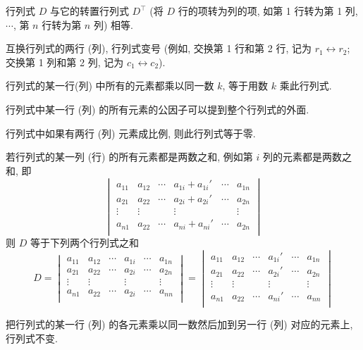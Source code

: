 \begin{theorem}[行列式的转置]
    行列式 $ D $ 与它的转置行列式 $ D^{\top} $ (将 $ D $ 行的项转为列的项, 如第 1 行转为第 1 列, $ \cdots $, 第 $ n $ 行转为第 $ n $ 列) 相等.
\end{theorem}
\begin{theorem}[变号定理]
    互换行列式的两行 (列), 行列式变号 (例如, 交换第 1 行和第 2 行, 记为 $ r_{1} \leftrightarrow r_{2} $; 交换第 1 列和第 2 列, 
    记为 $ c_{1} \leftrightarrow c_{2} $).
\end{theorem}
\begin{theorem}[行列式的数乘]
    行列式的某一行(列) 中所有的元素都乘以同一数 $ k $, 等于用数 $ k $ 乘此行列式.
\end{theorem}
\begin{inference}
    行列式中某一行 (列) 的所有元素的公因子可以提到整个行列式的外面.
\end{inference}
\begin{theorem}
    行列式中如果有两行 (列) 元素成比例, 则此行列式等于零.
\end{theorem}
\begin{theorem}[行列式拆分]
    若行列式的某一列 (行) 的所有元素都是两数之和, 例如第 $ i $ 列的元素都是两数之和, 即
    $$\begin{vmatrix}
            a_{11} & a_{12} & \cdots & a_{1i}+a_{1i}' & \cdots & a_{1n} \\
            a_{21} & a_{22} & \cdots & a_{2i}+a_{2i}' & \cdots & a_{2n} \\
            \vdots & \vdots &        & \vdots         &        & \vdots \\
            a_{n1} & a_{22} & \cdots & a_{ni}+a_{ni}' & \cdots & a_{2n} \\
        \end{vmatrix}$$
    则 $D$ 等于下列两个行列式之和
    $$D=\begin{vmatrix}
            a_{11} & a_{12} & \cdots & a_{1i} & \cdots & a_{1n} \\
            a_{21} & a_{22} & \cdots & a_{2i} & \cdots & a_{2n} \\
            \vdots & \vdots &        & \vdots &        & \vdots \\
            a_{n1} & a_{22} & \cdots & a_{2i} & \cdots & a_{nn} \\
        \end{vmatrix}
        =\begin{vmatrix}
            a_{11} & a_{12} & \cdots & a_{1i}' & \cdots & a_{1n} \\
            a_{21} & a_{22} & \cdots & a_{2i}' & \cdots & a_{2n} \\
            \vdots & \vdots &        & \vdots  &        & \vdots \\
            a_{n1} & a_{22} & \cdots & a_{ni}' & \cdots & a_{nn} \\
        \end{vmatrix}$$
\end{theorem}
\begin{theorem}[行列式变换]
    把行列式的某一行 (列) 的各元素乘以同一数然后加到另一行 (列) 对应的元素上, 行列式不变.
\end{theorem}

